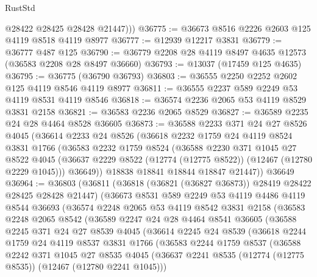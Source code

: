 \begin{lexlean}{RustStd}
\begin{coremodule}
          @28422
          @28425
          @28428
          @21447)))
@36775 := @36673 @8516 @2226 @2603 @125 @4119 @8518 @4119 @8977
@36777 := @12939 @12217 @3831
@36779 := @36777 @487 @125
@36790 := @36779 @2208 @28 @4119 @8497 @4635 @12573 (@36583 @2208 @28 @8497 @36660)
@36793 := @13037 (@17459 @125 @4635)
@36795 := @36775 (@36790 @36793)
@36803 := @36555 @2250 @2252 @2602 @125 @4119 @8546 @4119 @8977
@36811 := @36555 @2237 @589 @2249 @53 @4119 @8531 @4119 @8546
@36818 := @36574 @2236 @2065 @53 @4119 @8529 @3831 @2158
@36821 := @36583 @2236 @2065 @8529
@36827 := @36589 @2235 @24 @28 @4464 @8528 @36605
@36873 := @36588
    @2233
    @371
    @24
    @27
    @8526
    @4045
    (@36614
      @2233
      @24
      @8526
      (@36618
        @2232
        @1759
        @24
        @4119
        @8524
        @3831
        @1766
        (@36583
          @2232
          @1759
          @8524
          (@36588
            @2230
            @371
            @1045
            @27
            @8522
            @4045
            (@36637 @2229 @8522 (@12774 (@12775 @8522)) (@12467 (@12780 @2229 @1045)))
            @36649))
        @18838
        @18841
        @18844
        @18847
        @21447))
    @36649
@36964 := @36803
    (@36811
      (@36818 (@36821 (@36827 @36873)) @28419 @28422 @28425 @28428 @21447)
      (@36673
        @8531
        @589
        @2249
        @53
        @4119
        @4486
        @4119
        @8544
        @36693
        (@36574
          @2248
          @2065
          @53
          @4119
          @8542
          @3831
          @2158
          (@36583
            @2248
            @2065
            @8542
            (@36589
              @2247
              @24
              @28
              @4464
              @8541
              @36605
              (@36588
                @2245
                @371
                @24
                @27
                @8539
                @4045
                (@36614
                  @2245
                  @24
                  @8539
                  (@36618
                    @2244
                    @1759
                    @24
                    @4119
                    @8537
                    @3831
                    @1766
                    (@36583
                      @2244
                      @1759
                      @8537
                      (@36588
                        @2242
                        @371
                        @1045
                        @27
                        @8535
                        @4045
                        (@36637 @2241 @8535 (@12774 (@12775 @8535)) (@12467 (@12780 @2241 @1045)))

\end{coremodule}
\end{lexlean}
